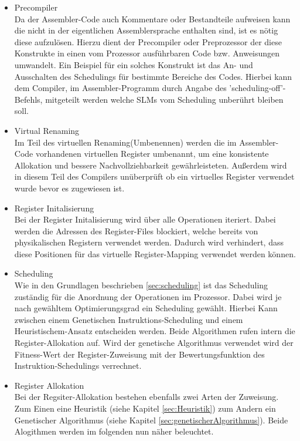 \begin{itemize}
	\item Precompiler\\
		Da der Assembler-Code auch Kommentare oder Bestandteile aufweisen kann die nicht in der eigentlichen Assemblersprache enthalten sind, ist es nötig diese aufzulösen. Hierzu dient der Precompiler oder Preprozessor der diese Konstrukte in einen vom Prozessor ausführbaren Code bzw. Anweisungen umwandelt. Ein Beispiel für ein solches Konstrukt ist das An- und Ausschalten des Schedulings für bestimmte Bereiche des Codes. Hierbei kann dem Compiler, im Assembler-Programm durch Angabe des 'scheduling-off'-Befehls, mitgeteilt werden welche SLMs vom Scheduling unberührt bleiben soll.
	\item Virtual Renaming\\
		Im Teil des virtuellen Renaming(Umbenennen) werden die im Assembler-Code vorhandenen virtuellen Register umbenannt, um eine konsistente Allokation und bessere Nachvollziehbarkeit gewährleisteten. Außerdem wird in diesem Teil des Compilers unüberprüft ob ein virtuelles Register verwendet wurde bevor es zugewiesen ist.
	\item Register Initalisierung\\
		Bei der Register Initalisierung wird über alle Operationen iteriert. Dabei werden die Adressen des Register-Files blockiert, welche bereits von physikalischen Registern verwendet werden. Dadurch wird verhindert, dass diese Positionen für das virtuelle Register-Mapping verwendet werden können.
	\item Scheduling\\
		Wie in den Grundlagen beschrieben \ref{sec:scheduling} ist das Scheduling zuständig für die Anordnung der Operationen im Prozessor. Dabei wird je nach gewähltem Optimierungsgrad ein Scheduling gewählt. Hierbei Kann zwischen einem Genetischen Instruktions-Scheduling und einem Heuristischem-Ansatz entscheiden werden. Beide Algorithmen rufen intern die Register-Allokation auf. Wird der genetische Algorithmus verwendet wird der Fitness-Wert der Register-Zuweisung mit der Bewertungsfunktion des Instruktion-Schedulings verrechnet.
	\item Register Allokation\\
		Bei der Regsiter-Allokation bestehen ebenfalls zwei Arten der Zuweisung. Zum Einen eine Heuristik (siehe Kapitel \ref{sec:Heuristik}) zum Andern ein Genetischer Algorithmus (siehe Kapitel \ref{sec:genetischerAlgorithmus}). Beide Alogithmen werden im folgenden nun näher beleuchtet.
\end{itemize}


